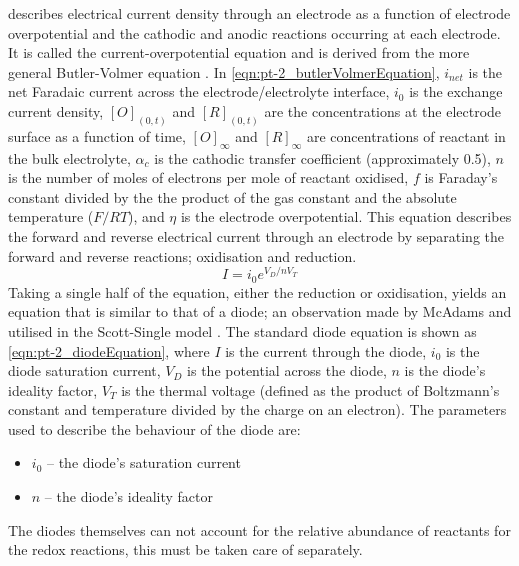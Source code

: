        describes electrical current density through an electrode as a function of electrode overpotential and the cathodic and anodic reactions occurring at each electrode.
      It is called the current-overpotential equation and is derived from the more general Butler-Volmer equation \cite{Merrill2005,ScottSingle2013}.
      In \cref{eqn:pt-2_butlerVolmerEquation}, $i_{net}$ is the net Faradaic current across the electrode/electrolyte interface,
      $i_{0}$ is the exchange current density,
      $[O]_{(0,t)}$ and $[R]_{(0,t)}$ are the concentrations at the electrode surface as a function of time,
      $[O]_{\infty}$ and $[R]_{\infty}$ are concentrations of reactant in the bulk electrolyte,
      $\alpha_{c}$ is the cathodic transfer coefficient (approximately 0.5),
      $n$ is the number of moles of electrons per mole of reactant oxidised,
      $f$ is Faraday's constant divided by the the product of the gas constant and the absolute temperature ($F/RT$),
      and $\eta$ is the electrode overpotential.
      This equation describes the forward and reverse electrical current through an electrode by separating the forward and reverse reactions; oxidisation and reduction.
      \begin{equation}
        I = i_0 e^{V_D / n V_T}
        \label{eqn:pt-2_diodeEquation}
      \end{equation}
      Taking a single half of the equation, either the reduction or oxidisation, yields an equation that is similar to that of a diode; an observation made by McAdams and utilised in the Scott-Single model \cite{McAdams1995}.
      The standard diode equation is shown as \cref{eqn:pt-2_diodeEquation}, where
      $I$ is the current through the diode,
      $i_0$ is the diode saturation current,
      $V_D$ is the potential across the diode,
      $n$ is the diode's ideality factor,
      $V_T$ is the thermal voltage (defined as the product of Boltzmann's constant and temperature divided by the charge on an electron).
      The parameters used to describe the behaviour of the diode are:
      \begin{itemize}
        \item $i_0$ -- the diode's saturation current
        \item $n$ -- the diode's ideality factor
      \end{itemize}
      The diodes themselves can not account for the relative abundance of reactants for the redox reactions, this must be taken care of separately.

